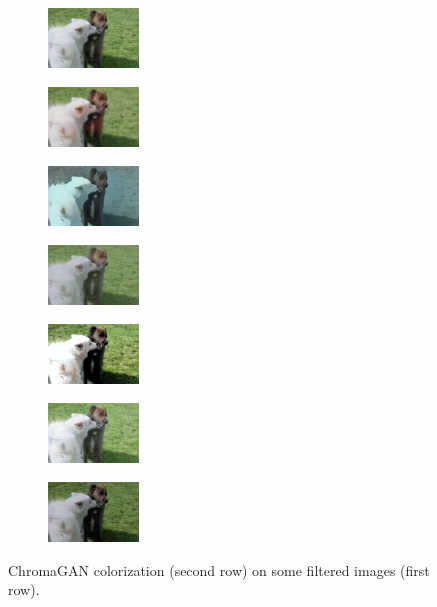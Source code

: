 \begin{figure}[ht]
				\begin{subfigure}[b]{0.1\textwidth}
			\centering
			\includegraphics[width=2.4cm]{c - filter.jpeg}

		\end{subfigure}
		\hfill
		\begin{subfigure}[b]{0.1\textwidth}
			\includegraphics[width=2.4cm]{c - filter - blurr.jpeg}
		\end{subfigure}
		\hfill
		\begin{subfigure}[b]{0.1\textwidth}
			\includegraphics[width=2.4cm]{c - filter - cartoon.jpeg}
		
		\end{subfigure}
		\hfill
		\begin{subfigure}[b]{0.1\textwidth}
			\includegraphics[width=2.4cm]{c - filter - man contr (1).jpg}
	
		\end{subfigure}
		\hfill
		\begin{subfigure}[b]{0.1\textwidth}
			\includegraphics[width=2.4cm]{c - filter - man contr (2).jpg}
	
		\end{subfigure}
		\hfill
		\begin{subfigure}[b]{0.1\textwidth}
			\includegraphics[width=2.4cm]{c - filter - lumin (1).jpeg}
	
		\end{subfigure}
		\hfill
		\begin{subfigure}[b]{0.1\textwidth}
			\includegraphics[width=2.4cm]{c - filter - lumin (2).jpeg}
	
		\end{subfigure}
	\caption{{\small ChromaGAN colorization (second row) on some filtered images (first row).}}
	\label{fig:filter}
\end{figure}